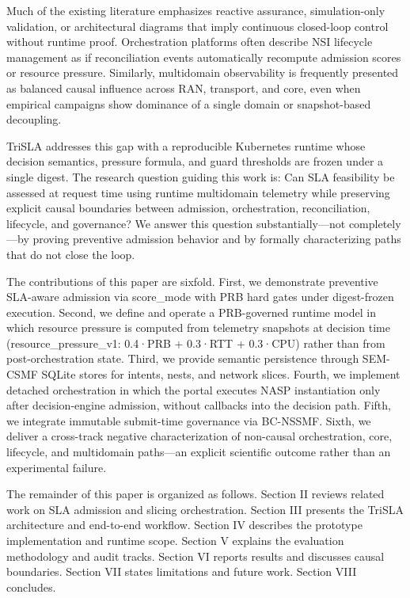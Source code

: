 \documentclass[journal]{IEEEtran}
\begin{document}
Much of the existing literature emphasizes reactive assurance, simulation-only validation, or architectural diagrams that imply continuous closed-loop control without runtime proof. Orchestration platforms often describe NSI lifecycle management as if reconciliation events automatically recompute admission scores or resource pressure. Similarly, multidomain observability is frequently presented as balanced causal influence across RAN, transport, and core, even when empirical campaigns show dominance of a single domain or snapshot-based decoupling.

TriSLA addresses this gap with a reproducible Kubernetes runtime whose decision semantics, pressure formula, and guard thresholds are frozen under a single digest. The research question guiding this work is: Can SLA feasibility be assessed at request time using runtime multidomain telemetry while preserving explicit causal boundaries between admission, orchestration, reconciliation, lifecycle, and governance? We answer this question substantially—not completely—by proving preventive admission behavior and by formally characterizing paths that do not close the loop.

The contributions of this paper are sixfold. First, we demonstrate preventive SLA-aware admission via score_mode with PRB hard gates under digest-frozen execution. Second, we define and operate a PRB-governed runtime model in which resource pressure is computed from telemetry snapshots at decision time (resource_pressure_v1: 0.4·PRB + 0.3·RTT + 0.3·CPU) rather than from post-orchestration state. Third, we provide semantic persistence through SEM-CSMF SQLite stores for intents, nests, and network slices. Fourth, we implement detached orchestration in which the portal executes NASP instantiation only after decision-engine admission, without callbacks into the decision path. Fifth, we integrate immutable submit-time governance via BC-NSSMF. Sixth, we deliver a cross-track negative characterization of non-causal orchestration, core, lifecycle, and multidomain paths—an explicit scientific outcome rather than an experimental failure.

The remainder of this paper is organized as follows. Section II reviews related work on SLA admission and slicing orchestration. Section III presents the TriSLA architecture and end-to-end workflow. Section IV describes the prototype implementation and runtime scope. Section V explains the evaluation methodology and audit tracks. Section VI reports results and discusses causal boundaries. Section VII states limitations and future work. Section VIII concludes.
\end{document}
